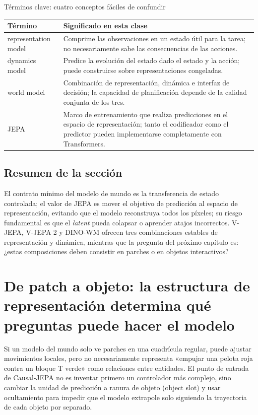 \documentclass[a4paper]{article}
\begin{document}
\begin{knowledgebox}{Términos clave: cuatro conceptos fáciles de confundir}
\begin{tabularx}{\textwidth}{L{0.20\textwidth} X}
\toprule
Término & Significado en esta clase \\
\midrule
representation model & Comprime las observaciones en un estado útil para la tarea; no necesariamente sabe las consecuencias de las acciones. \\
dynamics model & Predice la evolución del estado dado el estado y la acción; puede construirse sobre representaciones congeladas. \\
world model & Combinación de representación, dinámica e interfaz de decisión; la capacidad de planificación depende de la calidad conjunta de los tres. \\
JEPA & Marco de entrenamiento que realiza predicciones en el espacio de representación; tanto el codificador como el predictor pueden implementarse completamente con Transformers. \\
\bottomrule
\end{tabularx}
\end{knowledgebox}

\subsection{Resumen de la sección}

El contrato mínimo del modelo de mundo es la transferencia de estado controlada; el valor de JEPA es mover el objetivo de predicción al espacio de representación, evitando que el modelo reconstruya todos los píxeles; su riesgo fundamental es que el \textit{latent} pueda colapsar o aprender atajos incorrectos. V-JEPA, V-JEPA 2 y DINO-WM ofrecen tres combinaciones estables de representación y dinámica, mientras que la pregunta del próximo capítulo es: ¿estas composiciones deben consistir en parches o en objetos interactivos?
\section{De patch a objeto: la estructura de representación determina qué preguntas puede hacer el modelo}

Si un modelo del mundo solo ve parches en una cuadrícula regular, puede ajustar movimientos locales, pero no necesariamente representa «empujar una pelota roja contra un bloque T verde» como relaciones entre entidades. El punto de entrada de Causal-JEPA no es inventar primero un controlador más complejo, sino cambiar la unidad de predicción a ranura de objeto (object slot) y usar ocultamiento para impedir que el modelo extrapole solo siguiendo la trayectoria de cada objeto por separado.
\end{document}

